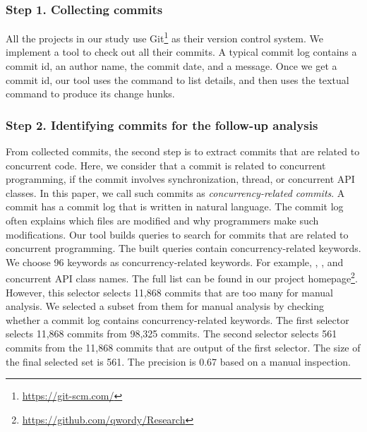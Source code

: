 \subsubsection{Step 1. Collecting commits} All the projects in our study use Git\footnote{\url{https://git-scm.com/}} as their version control system. We implement a tool to check out all their commits. A typical commit log contains a commit id, an author name, the commit date, and a message. Once we get a commit id, our tool uses the  command to list details, and then uses the textual  command to produce its change hunks.

\subsubsection{Step 2. Identifying commits for the follow-up analysis} From collected commits, the second step is to extract commits that are related to concurrent code. Here, we consider that a commit is related to concurrent programming, if the commit involves synchronization, thread, or concurrent API classes. In this paper, we call such commits as \emph{concurrency-related commits}. A commit has a commit log that is written in natural language. The commit log often explains which files are modified and why programmers make such modifications. Our tool builds queries to search for commits that are related to concurrent programming. The built queries contain concurrency-related keywords. We choose 96 keywords as concurrency-related keywords. For example, , , and concurrent API class names. The full list can be found in our project homepage\footnote{\url{https://github.com/qwordy/Research}}. However, this selector selects 11,868 commits that are too many for manual analysis. We selected a subset from them for manual analysis by checking whether a commit log contains concurrency-related keywords. The first selector selects 11,868 commits from 98,325 commits. The second selector selects 561 commits from the 11,868 commits that are output of the first selector. The size of the final selected set is 561. The precision is 0.67 based on a manual inspection.

